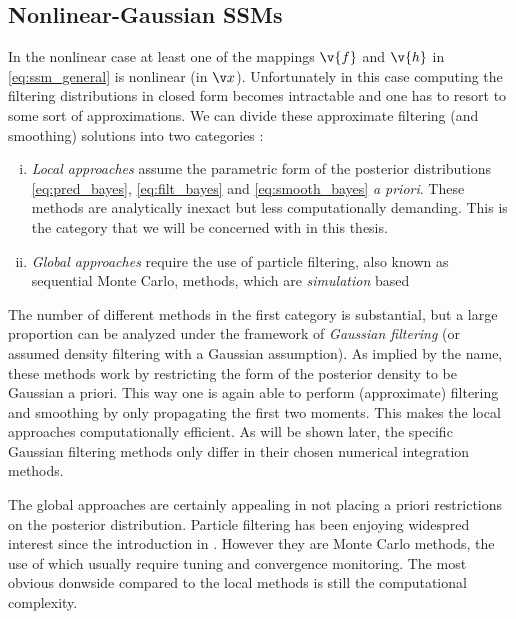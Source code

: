\subsection{Nonlinear-Gaussian SSMs}%
\label{sec:nonlinear_state}
In the nonlinear case at least one of the mappings $\v{f}$ and $\v{h}$ in
\eqref{eq:ssm_general} is nonlinear (in $\x$). Unfortunately in this case computing the filtering
distributions in closed form becomes intractable and one has to resort to 
some sort of approximations. We can
divide these approximate filtering (and smoothing) solutions into two 
categories \parencite[see, e.g.,][]{Arasaratnam2009}: 
\begin{enumerate}[i)] \addtolength{\leftskip}{.5cm} \itemsep1pt \parskip0pt 
  \item \emph{Local approaches} assume the parametric form of the posterior
  distributions \eqref{eq:pred_bayes}, \eqref{eq:filt_bayes} and \eqref{eq:smooth_bayes} \emph{a priori}. 
  These  methods are analytically inexact but less computationally demanding. This is the category that
we will be concerned with in this thesis. 
  \item \emph{Global approaches} require the use of particle filtering, also known as sequential Monte Carlo, 
  methods, which are \emph{simulation} based
\end{enumerate}%
%
The number of different methods in the first category is substantial,
but a large proportion can be analyzed under the framework of
\emph{Gaussian filtering} (or assumed density filtering
with a Gaussian assumption). As implied by the name, these
methods work by restricting the form of the posterior density to be Gaussian
a priori. This way one is again able to perform (approximate) filtering and smoothing
by only propagating the first two moments. This makes the local approaches
computationally efficient.  As will be shown later, the specific Gaussian filtering 
methods only differ in their chosen numerical integration methods.

The global approaches are certainly appealing in not placing
a priori restrictions on the posterior distribution. Particle filtering
has been enjoying widespred interest since the introduction 
in \textcite{Gordon1993} \parencite[see also][]{Cappe2007,Kantas2009,Cappe2005}. However they
are Monte Carlo methods, the use of which usually require tuning
and convergence monitoring. The most obvious donwside compared to
the local methods is still the computational complexity. 

